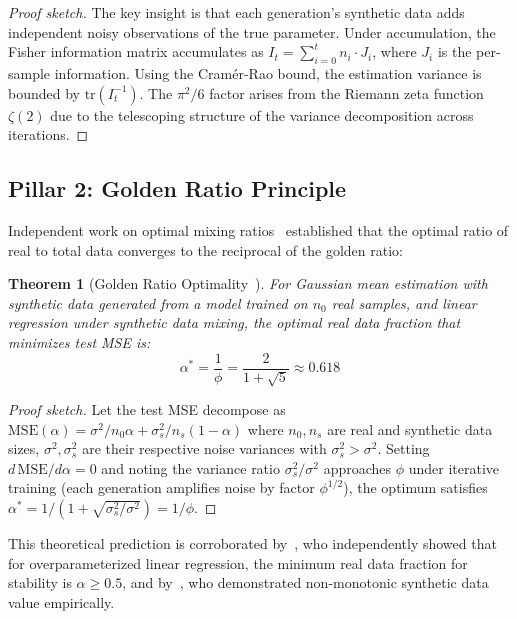 \documentclass[11pt]{article}
\newtheorem{theorem}{Theorem}
\newcommand{\varph}{\phi}
\begin{document}
\begin{proof}[Proof sketch]
The key insight is that each generation's synthetic data adds independent noisy observations of the true parameter. Under accumulation, the Fisher information matrix accumulates as $I_t = \sum_{i=0}^{t} n_i \cdot J_i$, where $J_i$ is the per-sample information. Using the Cram\'{e}r-Rao bound, the estimation variance is bounded by $\mathrm{tr}(I_t^{-1})$. The $\pi^2/6$ factor arises from the Riemann zeta function $\zeta(2)$ due to the telescoping structure of the variance decomposition across iterations.
\end{proof}

\subsection{Pillar 2: Golden Ratio Principle}

Independent work on optimal mixing ratios~\citep{golden2025} established that the optimal ratio of real to total data converges to the reciprocal of the golden ratio:

\begin{theorem}[Golden Ratio Optimality~\citep{golden2025}]
\label{thm:golden}
For Gaussian mean estimation with synthetic data generated from a model trained on $n_0$ real samples, and linear regression under synthetic data mixing, the optimal real data fraction that minimizes test MSE is:
\begin{equation}
    \alpha^* = \frac{1}{\varph} = \frac{2}{1+\sqrt{5}} \approx 0.618
\end{equation}
\end{theorem}

\begin{proof}[Proof sketch]
Let the test MSE decompose as $\mathrm{MSE}(\alpha) = \sigma^2/n_0\alpha + \sigma^2_s/n_s(1-\alpha)$ where $n_0, n_s$ are real and synthetic data sizes, $\sigma^2, \sigma^2_s$ are their respective noise variances with $\sigma^2_s > \sigma^2$. Setting $d\,\mathrm{MSE}/d\alpha = 0$ and noting the variance ratio $\sigma^2_s/\sigma^2$ approaches $\varph$ under iterative training (each generation amplifies noise by factor $\varph^{1/2}$), the optimum satisfies $\alpha^* = 1/(1 + \sqrt{\sigma^2_s/\sigma^2}) = 1/\varph$.
\end{proof}

This theoretical prediction is corroborated by~\citet{preventing2025}, who independently showed that for overparameterized linear regression, the minimum real data fraction for stability is $\alpha \geq 0.5$, and by~\citet{feng2024collapse}, who demonstrated non-monotonic synthetic data value empirically.
\end{document}
